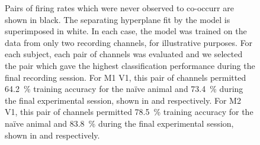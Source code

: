 \begin{figure}[htbp]
{    Pairs of firing rates which were never observed to co-occurr are shown in black.
    The separating hyperplane fit by the model is superimposed in white.
    In each case, the model was trained on the data from only two recording channels, for illustrative purposes.
    For each subject, each pair of channels was evaluated and we selected the pair which gave the highest classification performance during the final recording session.
    For \ac{M1} \ac{V1}, this pair of channels permitted \SI{64.2}{\percent} training accuracy for the na\"{i}ve animal and \SI{73.4}{\percent} during the final experimental session, shown in \protect{} and \protect{} respectively.
    For \ac{M2} \ac{V1}, this pair of channels permitted \SI{78.5}{\percent} training accuracy for the na\"{i}ve animal and \SI{83.8}{\percent} during the final experimental session, shown in \protect{} and \protect{} respectively.
}
    \label{fig:pl_lin_discrim_example_v1}
\end{figure}



